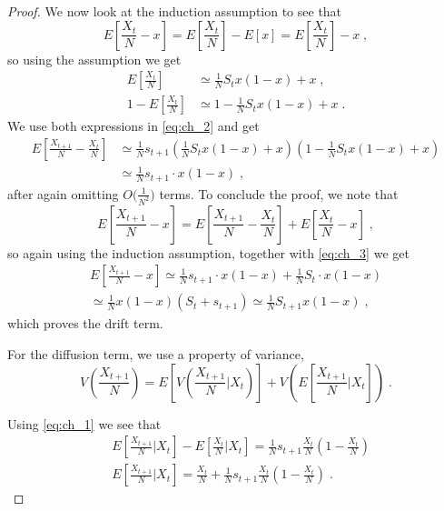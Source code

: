 \documentclass[12pt]{extarticle}
\begin{document}
\begin{appendices}
\begin{proof}
We now look at the induction assumption to see that
\begin{equation}
E\left[\frac{X_t}{N}-x\right]
= E\left[\frac{X_t}{N}\right]-E[x]
= E\left[\frac{X_t}{N}\right]-x \;,
\end{equation}
so using the assumption we get
\begin{equation}
\begin{split}
E\left[\frac{X_t}{N}\right] 
&\simeq \frac{1}{N} S_t x(1-x)+x \;, \\
1 - E\left[\frac{X_t}{N}\right] 
&\simeq 1- \frac{1}{N} S_t x(1-x)+x \;.
\end{split}
\end{equation}
We use both expressions in \cref{eq:ch_2} and get
\begin{equation}\label{eq:ch_3}
\begin{split}
E\left[\frac{X_{t+1}}{N}-\frac{X_t}{N}\right] 
&\simeq \frac{1}{N}s_{t+1} \left(\frac{1}{N} S_t x(1-x)+x \right)\left(1- \frac{1}{N} S_t x(1-x)+x \right) \\
&\simeq  \frac{1}{N}s_{t+1}\cdot x(1-x) \;,
\end{split}
\end{equation}
after again omitting $O\big(\frac{1}{N^2}\big)$ terms.
To conclude the proof, we note that
\begin{equation}
E\left[\frac{X_{t+1}}{N}-x\right] 
= E\left[\frac{X_{t+1}}{N}-\frac{X_t}{N}\right] + E\left[\frac{X_t}{N}-x\right] \;,
\end{equation}
so again using the induction assumption, together with \cref{eq:ch_3} we get
\begin{equation}
\begin{split}
E\left[\frac{X_{t+1}}{N}-x\right] \simeq \frac{1}{N}s_{t+1}\cdot x(1-x) + \frac{1}{N}S_t\cdot x(1-x) \\
\simeq \frac{1}{N}x(1-x)(S_t + s_{t+1}) 
\simeq \frac{1}{N} S_{t+1} x(1-x) \;,
\end{split}
\end{equation}
which proves the drift term.

For the diffusion term, we use a property of variance,
\begin{equation}\label{eq:ch_var}
V\left(\frac{X_{t+1}}{N}\right) 
= E\left[V\left(\frac{X_{t+1}}{N} \bigg|X_t \right)\right] + V\left(E\left[\frac{X_{t+1}}{N} \bigg|X_t \right]\right) \;.
\end{equation}

Using \cref{eq:ch_1} we see that
\begin{equation}\label{eq:ch_var1}
\begin{split}
&E\left[\frac{X_{t+1}}{N} \bigg|X_t \right] - E\left[\frac{X_{t}}{N} \bigg|X_t \right] 
= \frac{1}{N}s_{t+1}\frac{X_t}{N}\left(1-\frac{X_t}{N} \right) \\
&E\left[\frac{X_{t+1}}{N} \bigg|X_t \right] 
= \frac{X_t}{N} + \frac{1}{N}s_{t+1}\frac{X_t}{N}\left(1-\frac{X_t}{N} \right) \;.
\end{split}
\end{equation}


\end{proof}
\end{appendices}
\end{document}
